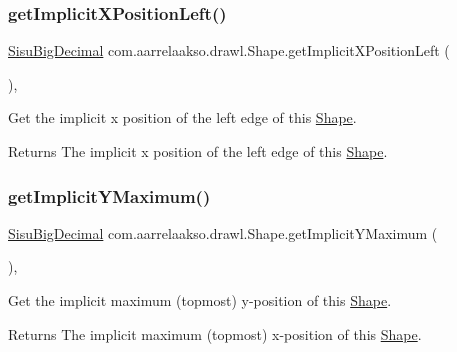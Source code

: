 \subsubsection{\texorpdfstring{get\+Implicit\+X\+Position\+Left()}{getImplicitXPositionLeft()}}
{\footnotesize\ttfamily \hyperlink{classcom_1_1aarrelaakso_1_1drawl_1_1_sisu_big_decimal}{Sisu\+Big\+Decimal} com.\+aarrelaakso.\+drawl.\+Shape.\+get\+Implicit\+X\+Position\+Left (\begin{DoxyParamCaption}{ }\end{DoxyParamCaption})\hspace{0.3cm}{\ttfamily [protected]}, {\ttfamily [inherited]}}



Get the implicit x position of the left edge of this \hyperlink{classcom_1_1aarrelaakso_1_1drawl_1_1_shape}{Shape}. 

\begin{DoxyReturn}{Returns}
The implicit x position of the left edge of this \hyperlink{classcom_1_1aarrelaakso_1_1drawl_1_1_shape}{Shape}. 
\end{DoxyReturn}
\mbox{\label{classcom_1_1aarrelaakso_1_1drawl_1_1_shape_a7a4579f2966a3d5ebbfa46b5b2528f9d}} 
\subsubsection{\texorpdfstring{get\+Implicit\+Y\+Maximum()}{getImplicitYMaximum()}}
{\footnotesize\ttfamily \hyperlink{classcom_1_1aarrelaakso_1_1drawl_1_1_sisu_big_decimal}{Sisu\+Big\+Decimal} com.\+aarrelaakso.\+drawl.\+Shape.\+get\+Implicit\+Y\+Maximum (\begin{DoxyParamCaption}{ }\end{DoxyParamCaption})\hspace{0.3cm}{\ttfamily [protected]}, {\ttfamily [inherited]}}



Get the implicit maximum (topmost) y-\/position of this \hyperlink{classcom_1_1aarrelaakso_1_1drawl_1_1_shape}{Shape}. 

\begin{DoxyReturn}{Returns}
The implicit maximum (topmost) x-\/position of this \hyperlink{classcom_1_1aarrelaakso_1_1drawl_1_1_shape}{Shape}. 
\end{DoxyReturn}
\mbox{\label{classcom_1_1aarrelaakso_1_1drawl_1_1_shape_aa0877965f7f172378e87ba69f27c7ad6}} 
